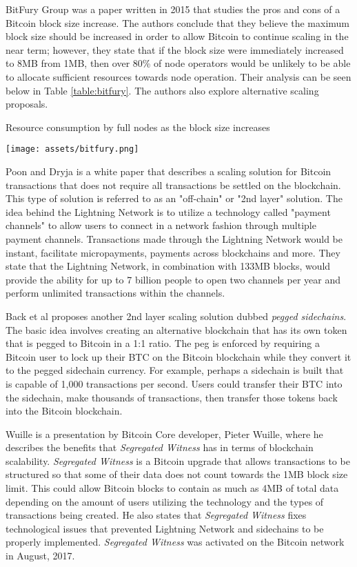 \documentclass[12pt]{report}
\begin{document}
BitFury Group \cite{BitFuryGroup.2015} was a paper written in 2015 that studies the pros and cons of a Bitcoin block size increase. The authors conclude that they believe the maximum block size should be increased in order to allow Bitcoin to continue scaling in the near term; however, they state that if the block size were immediately increased to 8MB from 1MB, then over 80\% of node operators would be unlikely to be able to allocate sufficient resources towards node operation. Their analysis can be seen below in Table \ref{table:bitfury}. The authors also explore alternative scaling proposals.

\begin{table}[h!]
\caption{Resource consumption by full nodes as the block size increases \cite{BitFuryGroup.2015}}
\texttt{[image: assets/bitfury.png]}
\label{table:bitfury}
\end{table}

Poon and Dryja \cite{Poon.2016} is a white paper that describes a scaling solution for Bitcoin transactions that does not require all transactions be settled on the blockchain. This type of solution is referred to as an "off-chain" or "2nd layer" solution. The idea behind the Lightning Network is to utilize a technology called "payment channels" to allow users to connect in a network fashion through multiple payment channels. Transactions made through the Lightning Network would be instant, facilitate micropayments, payments across blockchains and more. They state that the Lightning Network, in combination with 133MB blocks, would provide the ability for up to 7 billion people to open two channels per year and perform unlimited transactions within the channels.

Back et al \cite{Back.2014} proposes another 2nd layer scaling solution dubbed \textit{pegged sidechains}. The basic idea involves creating an alternative blockchain that has its own token that is pegged to Bitcoin in a 1:1 ratio. The peg is enforced by requiring a Bitcoin user to lock up their BTC on the Bitcoin blockchain while they convert it to the pegged sidechain currency. For example, perhaps a sidechain is built that is capable of 1,000 transactions per second. Users could transfer their BTC into the sidechain, make thousands of transactions, then transfer those tokens back into the Bitcoin blockchain.

Wuille \cite{Wuille.2015} is a presentation by Bitcoin Core developer, Pieter Wuille, where he describes the benefits that \textit{Segregated Witness} has in terms of blockchain scalability. \textit{Segregated Witness} is a Bitcoin upgrade that allows transactions to be structured so that some of their data does not count towards the 1MB block size limit. This could allow Bitcoin blocks to contain as much as 4MB of total data depending on the amount of users utilizing the technology and the types of transactions being created. He also states that \textit{Segregated Witness} fixes technological issues that prevented Lightning Network and sidechains to be properly implemented. \textit{Segregated Witness} was activated on the Bitcoin network in August, 2017.
\end{document}

